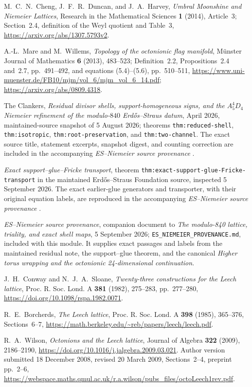 
M.~C.~N.~Cheng, J.~F.~R.~Duncan, and J.~A.~Harvey,
\emph{Umbral Moonshine and Niemeier Lattices},
Research in the Mathematical Sciences \textbf{1} (2014), Article~3;
Section~2.4, definition of the Weyl quotient and Table~3,
\url{https://arxiv.org/abs/1307.5793v2}.

A.-L.~Mare and M.~Willems,
\emph{Topology of the octonionic flag manifold},
M\"unster Journal of Mathematics \textbf{6} (2013), 483--523;
Definition~2.2, Propositions~2.4 and~2.7, pp.~491--492,
and equations (5.4)--(5.6), pp.~510--511,
\url{https://www.uni-muenster.de/FB10/mjm/vol_6/mjm_vol_6_14.pdf};
\url{https://arxiv.org/abs/0809.4318}.

The Clankers,
\emph{Residual divisor shells, support-homogeneous signs, and the
\(A_5^4D_4\) Niemeier refinement of the modulo-\(840\)
Erd\H{o}s--Straus datum},
April 2026, maintained-source snapshot of 5 August 2026;
theorems \texttt{thm:reduced-shell}, \texttt{thm:isotropic},
\texttt{thm:root-preservation}, and \texttt{thm:two-channel}.
The exact source title, statement excerpts, snapshot digest, and
counting correction are included in the accompanying
\emph{ES--Niemeier source provenance} \cite{esn:Provenance}.

\emph{Exact support--glue--Fricke transport},
theorem \nolinkurl{thm:exact-support-glue-Fricke-transport}
in the maintained Erd\H{o}s--Straus Foundation source,
inspected 5 September 2026.
The exact earlier-glue generators and transporter, with their original
equation labels, are reproduced in the accompanying
\emph{ES--Niemeier source provenance} \cite{esn:Provenance}.

\emph{ES--Niemeier source provenance},
companion document to \emph{The modulo-840 lattice, triality, and exact
shell maps}, 5 September 2026;
\nolinkurl{ES_NIEMEIER_PROVENANCE.md}, included with this module.
It supplies exact passages and labels from the maintained residual
note, the support--glue theorem, and the canonical
\emph{Higher torus wrapping and the octonionic 24-dimensional continuation}.


J.~H.~Conway and N.~J.~A.~Sloane,
\emph{Twenty-three constructions for the Leech lattice},
Proc. R. Soc. Lond. A \textbf{381} (1982), 275--283, pp.~277--280,
\url{https://doi.org/10.1098/rspa.1982.0071}.

R.~E.~Borcherds, \emph{The Leech lattice},
Proc. R. Soc. Lond. A \textbf{398} (1985), 365--376,
Sections~6--7,
\url{https://math.berkeley.edu/~reb/papers/leech/leech.pdf}.

R.~A.~Wilson, \emph{Octonions and the Leech lattice},
Journal of Algebra \textbf{322} (2009), 2186--2190,
\url{https://doi.org/10.1016/j.jalgebra.2009.03.021}.
Author version submitted 18 December 2008, revised 20 March 2009,
Sections~2--4, preprint pp.~2--6,
\url{https://webspace.maths.qmul.ac.uk/r.a.wilson/pubs_files/octoLeech1rev.pdf}.
